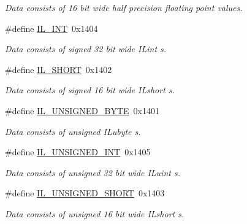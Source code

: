 \begin{DoxyCompactItemize}
\begin{DoxyCompactList}\small\item\em Data consists of 16 bit wide half precision floating point values. \end{DoxyCompactList}\item 
\hypertarget{group__il__data__types_ga6dd2fb48ea684fac690f06c5e83cb1a7}{\#define \hyperlink{group__il__data__types_ga6dd2fb48ea684fac690f06c5e83cb1a7}{I\+L\+\_\+\+I\+N\+T}~0x1404}\label{group__il__data__types_ga6dd2fb48ea684fac690f06c5e83cb1a7}

\begin{DoxyCompactList}\small\item\em Data consists of signed 32 bit wide {\itshape I\+Lint} s. \end{DoxyCompactList}\item 
\hypertarget{group__il__data__types_gac09bde8c51a0a780d68a6480842ae7bb}{\#define \hyperlink{group__il__data__types_gac09bde8c51a0a780d68a6480842ae7bb}{I\+L\+\_\+\+S\+H\+O\+R\+T}~0x1402}\label{group__il__data__types_gac09bde8c51a0a780d68a6480842ae7bb}

\begin{DoxyCompactList}\small\item\em Data consists of signed 16 bit wide {\itshape I\+Lshort} s. \end{DoxyCompactList}\item 
\hypertarget{group__il__data__types_ga22e9e14d5d5a8eb1de1766e72f4fd6e9}{\#define \hyperlink{group__il__data__types_ga22e9e14d5d5a8eb1de1766e72f4fd6e9}{I\+L\+\_\+\+U\+N\+S\+I\+G\+N\+E\+D\+\_\+\+B\+Y\+T\+E}~0x1401}\label{group__il__data__types_ga22e9e14d5d5a8eb1de1766e72f4fd6e9}

\begin{DoxyCompactList}\small\item\em Data consists of unsigned {\itshape I\+Lubyte} s. \end{DoxyCompactList}\item 
\hypertarget{group__il__data__types_gae6c1c42df44ca27d43803237a6a95a01}{\#define \hyperlink{group__il__data__types_gae6c1c42df44ca27d43803237a6a95a01}{I\+L\+\_\+\+U\+N\+S\+I\+G\+N\+E\+D\+\_\+\+I\+N\+T}~0x1405}\label{group__il__data__types_gae6c1c42df44ca27d43803237a6a95a01}

\begin{DoxyCompactList}\small\item\em Data consists of unsigned 32 bit wide {\itshape I\+Luint} s. \end{DoxyCompactList}\item 
\hypertarget{group__il__data__types_gaf300b01dedef0e94945c59ffc9b65531}{\#define \hyperlink{group__il__data__types_gaf300b01dedef0e94945c59ffc9b65531}{I\+L\+\_\+\+U\+N\+S\+I\+G\+N\+E\+D\+\_\+\+S\+H\+O\+R\+T}~0x1403}\label{group__il__data__types_gaf300b01dedef0e94945c59ffc9b65531}

\begin{DoxyCompactList}\small\item\em Data consists of unsigned 16 bit wide {\itshape I\+Lshort} s. \end{DoxyCompactList}\end{DoxyCompactItemize}


